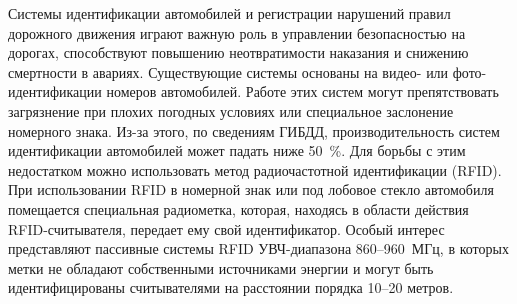 




{\actuality} Системы идентификации автомобилей и регистрации нарушений правил дорожного движения играют важную роль в управлении безопасностью на дорогах, способствуют повышению неотвратимости наказания и снижению смертности в авариях. Существующие системы основаны на видео- или фото-идентификации номеров автомобилей. Работе этих систем могут препятствовать загрязнение при плохих погодных условиях или специальное заслонение номерного знака. Из-за этого, по сведениям ГИБДД, производительность систем идентификации автомобилей может падать ниже 50~\%. Для борьбы с этим недостатком можно использовать метод радиочастотной идентификации (RFID). При использовании RFID в номерной знак или под лобовое стекло автомобиля помещается специальная радиометка, которая, находясь в области действия RFID-считывателя, передает ему свой идентификатор. Особый интерес представляют пассивные системы RFID УВЧ-диапазона 860--960~МГц, в которых метки не обладают собственными источниками энергии и могут быть идентифицированы считывателями на расстоянии порядка 10--20 метров.


